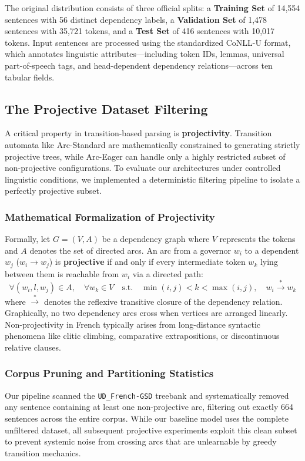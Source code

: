 \documentclass[12pt,a4paper]{article}
\begin{document}
The original distribution consists of three official splits: a \textbf{Training Set} of 14,554 sentences with 56 distinct dependency labels, a \textbf{Validation Set} of 1,478 sentences with 35,721 tokens, and a \textbf{Test Set} of 416 sentences with 10,017 tokens. Input sentences are processed using the standardized CoNLL-U format, which annotates linguistic attributes—including token IDs, lemmas, universal part-of-speech tags, and head-dependent dependency relations—across ten tabular fields.

\subsection{The Projective Dataset Filtering}
\label{subsec:projective_filtering}

A critical property in transition-based parsing is \textbf{projectivity}. Transition automata like Arc-Standard are mathematically constrained to generating strictly projective trees, while Arc-Eager can handle only a highly restricted subset of non-projective configurations. To evaluate our architectures under controlled linguistic conditions, we implemented a deterministic filtering pipeline to isolate a perfectly projective subset.

\subsubsection{Mathematical Formalization of Projectivity}
Formally, let $G = (V, A)$ be a dependency graph where $V$ represents the tokens and $A$ denotes the set of directed arcs. An arc from a governor $w_i$ to a dependent $w_j$ ($w_i \rightarrow w_j$) is \textbf{projective} if and only if every intermediate token $w_k$ lying between them is reachable from $w_i$ via a directed path:
\begin{equation}
    \forall (w_i, l, w_j) \in A, \quad \forall w_k \in V \quad \text{s.t.} \quad \min(i, j) < k < \max(i, j), \quad w_i \xrightarrow{*} w_k
\end{equation}
where $\xrightarrow{*}$ denotes the reflexive transitive closure of the dependency relation. Graphically, no two dependency arcs cross when vertices are arranged linearly. Non-projectivity in French typically arises from long-distance syntactic phenomena like clitic climbing, comparative extrapositions, or discontinuous relative clauses.

\subsubsection{Corpus Pruning and Partitioning Statistics}
Our pipeline scanned the \texttt{UD\_French-GSD} treebank and systematically removed any sentence containing at least one non-projective arc, filtering out exactly 664 sentences across the entire corpus. While our baseline model uses the complete unfiltered dataset, all subsequent projective experiments exploit this clean subset to prevent systemic noise from crossing arcs that are unlearnable by greedy transition mechanics.
\end{document}
